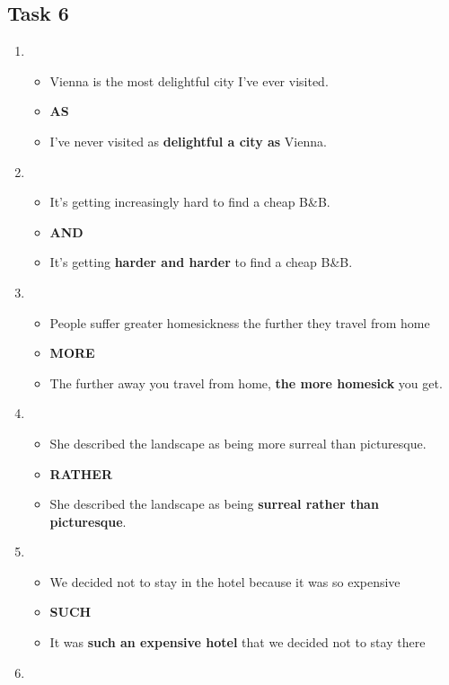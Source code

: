 \documentclass[a4paper]{article}
\begin{document}
\subsection{Task 6}
\begin{enumerate}
    \item \begin{itemize}
        \item Vienna is the most delightful city I've ever visited.
        \item \textbf{AS}
        \item I've never visited as \textbf{delightful a city as} Vienna.
    \end{itemize}
    \item \begin{itemize}
        \item It's getting increasingly hard to find a cheap B\&B.
        \item \textbf{AND}
        \item It's getting \textbf{harder and harder} to find a cheap B\&B.
    \end{itemize}
    \item \begin{itemize}
        \item People suffer greater homesickness the further they travel from home
        \item \textbf{MORE}
        \item The further away you travel from home, \textbf{the more homesick} you get.
    \end{itemize}
    \item \begin{itemize}
        \item She described the landscape as being more surreal than picturesque.
        \item \textbf{RATHER}
        \item She described the landscape as being \textbf{surreal rather than picturesque}.
    \end{itemize}
    \item \begin{itemize}
        \item We decided not to stay in the hotel because it was so expensive
        \item \textbf{SUCH}
        \item It was \textbf{such an expensive hotel} that we decided not to stay there
    \end{itemize}
    \item \begin{itemize}

\end{itemize}
\end{enumerate}
\end{document}
